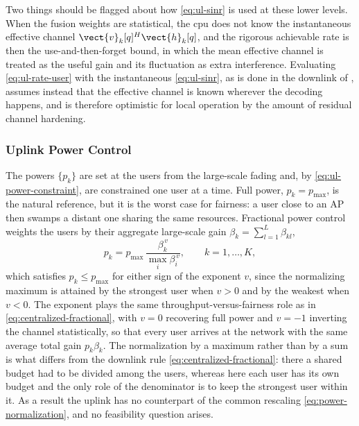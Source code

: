 Two things should be flagged about how \eqref{eq:ul-sinr} is used at these lower
levels. When the fusion weights are statistical, the \gls{cpu} does not know the
instantaneous effective channel $\vect{v}_{k}[q]^{H}\vect{h}_{k}[q]$, and the
rigorous achievable rate is then the use-and-then-forget bound, in which the mean
effective channel is treated as the useful gain and its fluctuation as extra
interference. Evaluating \eqref{eq:ul-rate-user} with the instantaneous
\eqref{eq:ul-sinr}, as is done in the downlink of ,
assumes instead that the effective channel is known wherever the decoding
happens, and is therefore optimistic for local operation by the amount of
residual channel hardening.


\subsubsection{Uplink Power Control}
\label{sssec:ul_power}

The powers $\{p_{k}\}$ are set at the users from the large-scale fading and, by
\eqref{eq:ul-power-constraint}, are constrained one user at a time. Full power,
$p_{k}=p_{\max}$, is the natural reference, but it is the worst case for
fairness: a user close to an AP then swamps a distant one sharing the same
resources. Fractional power control weights the users by their aggregate
large-scale gain $\beta_{k}=\sum_{l=1}^{L}\beta_{kl}$,
\begin{equation}
\label{eq:ul-fractional-power}
p_{k} = p_{\max}\,
\frac{\beta_{k}^{\,v}}{\max_{i}\beta_{i}^{\,v}},
\qquad k=1,\dots,K,
\end{equation}
which satisfies $p_{k}\leq p_{\max}$ for either sign of the exponent $v$, since
the normalizing maximum is attained by the strongest user when $v>0$ and by the
weakest when $v<0$. The exponent plays the same throughput-versus-fairness role
as in \eqref{eq:centralized-fractional}, with $v=0$ recovering full power and
$v=-1$ inverting the channel statistically, so that every user arrives at the
network with the same average total gain $p_{k}\beta_{k}$. The normalization by a
maximum rather than by a sum is what differs from the downlink rule
\eqref{eq:centralized-fractional}: there a shared budget had to be divided among
the users, whereas here each user has its own budget and the only role of the
denominator is to keep the strongest user within it. As a result the uplink has
no counterpart of the common rescaling \eqref{eq:power-normalization}, and no
feasibility question arises.

